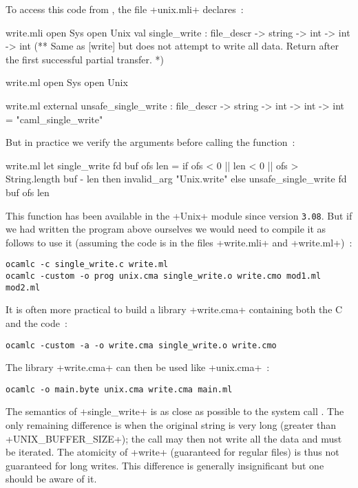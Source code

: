 To access this code from {\ocaml}, the file \ml+unix.mli+ declares~:
%
\begin{codefile}{write.mli}
open Sys
open Unix
val single_write : file_descr -> string -> int -> int -> int 
(** Same as [write] but does not attempt to write all data. Return after
the first successful partial transfer. *)
\end{codefile}
%
\begin{codefile}{write.ml}
open Sys
open Unix
\end{codefile}
%
\begin{listingcodefile}{write.ml}
external unsafe_single_write :
  file_descr -> string -> int -> int -> int = "caml_single_write"
\end{listingcodefile}
%
But in practice we verify the arguments before calling the function~: 
\begin{listingcodefile}{write.ml}
let single_write fd buf ofs len =
  if ofs < 0 || len < 0 || ofs > String.length buf - len
  then invalid_arg "Unix.write"
  else unsafe_single_write fd buf ofs len
\end{listingcodefile}
%
This function has been available in the \ml+Unix+ module since version
\texttt{3.08}. But if we had written the program above ourselves we would
need to compile it as follows to use it (assuming the {\ocaml} code is
in the files \ml+write.mli+ and \ml+write.ml+)~:
%
\begin{lstlisting}
ocamlc -c single_write.c write.ml
ocamlc -custom -o prog unix.cma single_write.o write.cmo mod1.ml mod2.ml
\end{lstlisting}
%
It is often more practical to build a library \ml+write.cma+ containing
both the C and the {\ocaml} code~:
%
\begin{lstlisting}
ocamlc -custom -a -o write.cma single_write.o write.cmo
\end{lstlisting}
%
The library \ml+write.cma+ can then be used like \ml+unix.cma+~:
%
\begin{lstlisting}
ocamlc -o main.byte unix.cma write.cma main.ml
\end{lstlisting}

The semantics of \ml+single_write+ is as close as possible to the
system call . The only remaining difference is when the
original string is very long (greater than \ml+UNIX_BUFFER_SIZE+); the
call may then not write all the data and must be iterated.  The
atomicity of \ml+write+ (guaranteed for regular files) is thus not
guaranteed for long writes. This difference is generally insignificant but one should
be aware of it.


